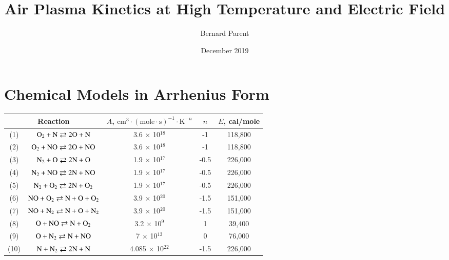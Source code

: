 \documentclass{warpdoc}
\author{
  Bernard Parent 
}
\title{Air Plasma Kinetics at High Temperature and Electric Field
}
\date{
  December 2019
}
\renewcommand{\fontsizetable}{\footnotesize\scalefont{0.9}}
\begin{document}
  \pagestyle{headings}
  \setcounter{page}{1}
  \makewarpdoctitle
  \tableofcontents
  \listoftables



\section{Chemical Models in Arrhenius Form}






%
\begin{table}[t]
\fontsizetable
\begin{center}
\begin{threeparttable}
\begin{tabular}{ccccc} 
\toprule
\multicolumn{2}{c}{Reaction} & $A$, $\textrm{cm}^3\cdot(\textrm{mole}\cdot \textrm{s})^{-1}\cdot \textrm{K}^{-n}$ & $n$ & $E$, cal/mole  \\ 
\midrule
(1) & $\rm O_2 + N \rightleftarrows 2O+N$ & 3.6 $\times$ 10$^{18}$  & -1 & 118,800 \\
(2) & $\rm O_2 + NO \rightleftarrows 2O+NO$ & 3.6 $\times$ 10$^{18}$ & -1 & 118,800 \\
(3) & $\rm N_2 + O \rightleftarrows 2N+O$ & 1.9 $\times$ 10$^{17}$ & -0.5 & 226,000 \\
(4) & $\rm N_2 + NO \rightleftarrows 2N+NO$ & 1.9 $\times$ 10$^{17}$ & -0.5 & 226,000 \\
(5) & $\rm N_2 + O_2 \rightleftarrows 2N+O_2$ & 1.9 $\times$ 10$^{17}$ & -0.5 & 226,000 \\
(6) & $\rm NO + O_2 \rightleftarrows N+O+O_2$ & 3.9 $\times$ 10$^{20}$ & -1.5 & 151,000 \\
(7) & $\rm NO + N_2 \rightleftarrows N+O+N_2$ & 3.9 $\times$ 10$^{20}$ & -1.5 & 151,000 \\
(8) & $\rm O + NO \rightleftarrows N+O_2$ & 3.2 $\times$ 10$^{9}$ & 1 & 39,400 \\
(9) & $\rm O + N_2 \rightleftarrows N+NO$ & 7 $\times$ 10$^{13}$ & 0 & 76,000 \\
(10) & $\rm N + N_2 \rightleftarrows 2N+N$ & 4.085 $\times$ 10$^{22}$ & -1.5 & 226,000 \\

\end{tabular}
\end{threeparttable}
\end{center}
\end{table}
\end{document}
